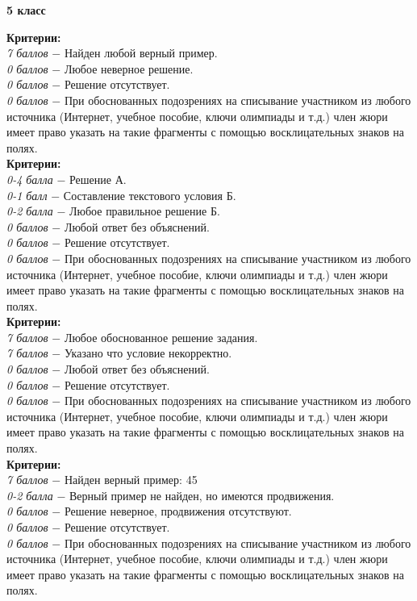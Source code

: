 \centerline{\bf \Huge 5 класс}

 \textbf{Критерии:} \\
\textit{7 баллов} $-$ Найден любой верный пример.\\
\textit{0 баллов} $-$ Любое неверное решение.\\
\textit{0 баллов} $-$ Решение отсутствует.\\
\textit{0 баллов} $-$ При обоснованных подозрениях на списывание участником из любого источника (Интернет, учебное пособие, ключи олимпиады и т.д.) член жюри имеет право указать на такие фрагменты с помощью восклицательных знаков на полях. \\

 \textbf{Критерии:} \\
\textit{0-4 балла} $-$ Решение А.\\
\textit{0-1 балл} $-$ Составление текстового условия Б.\\
\textit{0-2 балла} $-$ Любое правильное решение Б.\\
\textit{0 баллов} $-$ Любой ответ без объяснений.\\
\textit{0 баллов} $-$ Решение отсутствует.\\
\textit{0 баллов} $-$ При обоснованных подозрениях на списывание участником из любого источника (Интернет, учебное пособие, ключи олимпиады и т.д.) член жюри имеет право указать на такие фрагменты с помощью восклицательных знаков на полях. \\


 \textbf{Критерии:} \\
\textit{7 баллов} $-$ Любое обоснованное решение задания.\\
\textit{7 баллов} $-$ Указано что условие некорректно.\\
\textit{0 баллов} $-$ Любой ответ без объяснений.\\
\textit{0 баллов} $-$ Решение отсутствует.\\
\textit{0 баллов} $-$ При обоснованных подозрениях на списывание участником из любого источника (Интернет, учебное пособие, ключи олимпиады и т.д.) член жюри имеет право указать на такие фрагменты с помощью восклицательных знаков на полях. \\

 \textbf{Критерии:} \\
\textit{7 баллов} $-$ Найден верный пример: 45\\
\textit{0-2 балла} $-$ Верный пример не найден, но имеются продвижения.\\
\textit{0 баллов} $-$ Решение неверное, продвижения отсутствуют.\\
\textit{0 баллов} $-$ Решение отсутствует.\\
\textit{0 баллов} $-$ При обоснованных подозрениях на списывание участником из любого источника (Интернет, учебное пособие, ключи олимпиады и т.д.) член жюри имеет право указать на такие фрагменты с помощью восклицательных знаков на полях. \\

